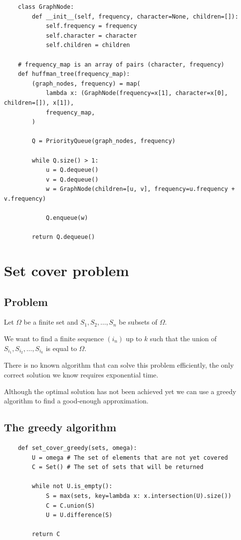 \documentclass[12pt]{extarticle}
\begin{document}
\begin{verbatim}
    class GraphNode:
        def __init__(self, frequency, character=None, children=[]):
            self.frequency = frequency
            self.character = character
            self.children = children

    # frequency_map is an array of pairs (character, frequency)
    def huffman_tree(frequency_map):
        (graph_nodes, frequency) = map(
            lambda x: (GraphNode(frequency=x[1], character=x[0], children=[]), x[1]),
            frequency_map,
        )

        Q = PriorityQueue(graph_nodes, frequency)

        while Q.size() > 1:
            u = Q.dequeue()
            v = Q.dequeue()
            w = GraphNode(children=[u, v], frequency=u.frequency + v.frequency)

            Q.enqueue(w)

        return Q.dequeue()
\end{verbatim}

\section{Set cover problem}

\subsection{Problem}

Let $\Omega$ be a finite set and $S_1, S_2, \ldots, S_n$ be subsets of $\Omega$.

We want to find a finite sequence $\left(i_n\right)$ up to $k$ such that the union of $S_{i_1}, S_{i_2}, \ldots, S_{i_k}$ is equal to $\Omega$.

There is no known algorithm that can solve this problem efficiently, the only correct solution we know requires exponential time.

Although the optimal solution has not been achieved yet we can use a greedy algorithm to find a good-enough approximation.

\subsection{The greedy algorithm}

\begin{verbatim}
    def set_cover_greedy(sets, omega):
        U = omega # The set of elements that are not yet covered
        C = Set() # The set of sets that will be returned

        while not U.is_empty():
            S = max(sets, key=lambda x: x.intersection(U).size())
            C = C.union(S)
            U = U.difference(S)

        return C
\end{verbatim}
\end{document}
